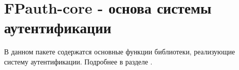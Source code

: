 \section{FPauth-core - основа системы аутентификации\label{fpauth-core---основа-системы-аутентификации}}\label{page-FPauth-core-leaf-page-index}%
В данном пакете содержатся основные функции библиотеки, реализующие систему аутентификации. Подробнее в разделе 
\hyperref[page-FPauth-core-module-FPauth+u+core]{}{}.


